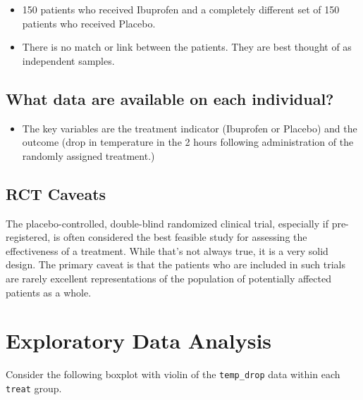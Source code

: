 \documentclass[
]{book}
\providecommand{\tightlist}{%
  \setlength{\itemsep}{0pt}\setlength{\parskip}{0pt}}
\begin{document}
\begin{itemize}
\tightlist
\item
  150 patients who received Ibuprofen and a completely different set of 150 patients who received Placebo.
\item
  There is no match or link between the patients. They are best thought of as independent samples.
\end{itemize}

\hypertarget{what-data-are-available-on-each-individual}{%
\subsection{\texorpdfstring{What \textbf{data} are available on each individual?}{What data are available on each individual?}}\label{what-data-are-available-on-each-individual}}

\begin{itemize}
\tightlist
\item
  The key variables are the treatment indicator (Ibuprofen or Placebo) and the outcome (drop in temperature in the 2 hours following administration of the randomly assigned treatment.)
\end{itemize}

\hypertarget{rct-caveats}{%
\subsection{RCT Caveats}\label{rct-caveats}}

The placebo-controlled, double-blind randomized clinical trial, especially if pre-registered, is often considered the best feasible study for assessing the effectiveness of a treatment. While that's not always true, it is a very solid design. The primary caveat is that the patients who are included in such trials are rarely excellent representations of the population of potentially affected patients as a whole.

\hypertarget{exploratory-data-analysis}{%
\section{Exploratory Data Analysis}\label{exploratory-data-analysis}}

Consider the following boxplot with violin of the \texttt{temp\_drop} data within each \texttt{treat} group.
\end{document}
